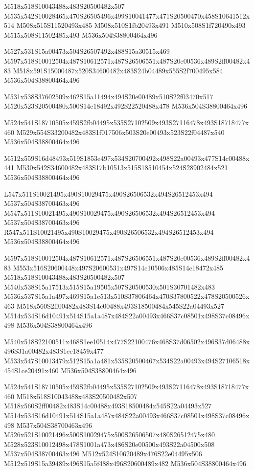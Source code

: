 \documentclass{article}
\begin{document}
\begin{multicols}{5}
\begin{center}

M518x518S10043488x483S20500482x507 %
M535x542S10028465x470S26505496x499S10041477x471S20500470x458S10641512x514 %
M508x515S11520493x485 %
M508x510S1fb20493x491 %
M510x508S1f720490x493 %
M515x508S11502485x493 %
M536x504S38800464x496 %

M527x531S15a00473x504S26507492x488S15a30515x469 %
M597x518S10012504x487S10612571x487S26506551x487S20e00536x489S2ff00482x483 %
M518x591S15000487x520S34600482x483S24b04489x555S2f700495x584 %
M536x504S38800464x496 %

M531x538S37602509x462S15a11494x494S20e00489x510S22f03470x517 %
M520x523S20500480x500S14c18492x492S22520488x478 %
M536x504S38800464x496 %

M524x541S18710505x459S2fb04495x535S27102509x493S27116478x493S18718477x460 %
M529x554S33200482x483S1f017506x503S20e00493x523S22f04487x540 %
M536x504S38800464x496 %

M512x559S16d48493x519S1853e497x534S20700492x498S22a00493x477S14c00488x441 %
M530x542S34600482x483S17b10513x515S18510454x524S28902484x521 %
M536x504S38800464x496 %

L547x511S10021495x490S10029475x490S26506532x494S26512453x494 %
M537x504S38700463x496 %
M547x511S10021495x490S10029475x490S26506532x494S26512453x494 %
M537x504S38700463x496 %
R547x511S10021495x490S10029475x490S26506532x494S26512453x494 %
M536x504S38800464x496 %

M597x518S10012504x487S10612571x487S26506551x487S20e00536x489S2ff00482x483 %
M553x516S20600448x497S20600531x497S14c10506x485S14c18472x485 %
M518x518S10043488x483S20500482x507 %
M540x538S15a17513x515S15a19505x507S20500530x501S30701482x483 %
M536x537S15a1a497x469S15a1c513x510S37806464x470S37800522x478S20500526x463 %
M518x560S2ff00482x483S14c00488x493S18500484x545S22a04493x527 %
M514x534S16d10491x514S15a1a487x484S22a00493x466S37c08501x498S37c08496x498 %
M536x504S38800464x496 %

M540x518S22100511x468S1ee10514x477S22100476x468S37d06502x496S37d06488x496S31a00482x483S1ee18459x477 %
M533x547S10013479x512S15a1a481x535S20500467x534S22a00493x494S27106518x454S1ce20491x460 %
M536x504S38800464x496 %

M524x541S18710505x459S2fb04495x535S27102509x493S27116478x493S18718477x460 %
M518x518S10043488x483S20500482x507 %
M518x560S2ff00482x483S14c00488x493S18500484x545S22a04493x527 %
M514x534S16d10491x514S15a1a487x484S22a00493x466S37c08501x498S37c08496x498 %
M537x504S38700463x496 %
M526x521S10021496x500S10029475x500S26506507x480S26512475x480 %
M528x523S10012498x478S1001a473x486S20e00500x493S22a04500x508 %
M537x504S38700463x496 %
M512x524S10620489x476S22e04495x506 %
M512x519S15a39489x496S15a5f488x496S20600489x482 %
M536x504S38800464x496 %

\end{center}
\end{multicols}
\end{document}
